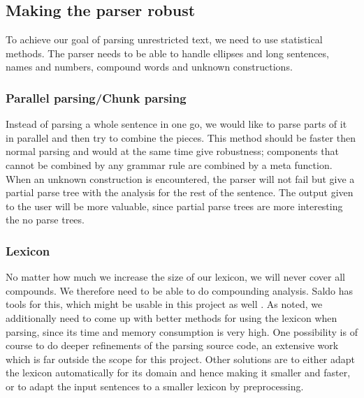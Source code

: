 \documentclass{report}
\begin{document}
\subsection{Making the parser robust}
To achieve our goal of parsing unrestricted text, we need to use statistical methods.
The parser needs to be able to handle
ellipses and long sentences, names and numbers,
compound words and unknown constructions.

\subsubsection{Parallel parsing/Chunk parsing}
Instead of parsing a whole sentence in one go, we would like to
parse parts of it in parallel and then try to combine the pieces.
This method should be faster then normal parsing and would
at the same time give robustness;
components that cannot be combined by any grammar rule are combined by a 
meta function. When an unknown construction is encountered, the parser
will not fail but give a partial parse tree with the analysis for the rest of
the sentence.
The output given to the user will be more valuable, since partial parse
trees are more interesting the no parse trees.

\subsubsection{Lexicon}
\label{sec:futureValency}
No matter how much we increase the size of our lexicon, we will
never cover all compounds. We therefore need to be able to do
compounding analysis. Saldo has tools for this, which might be usable
in this project as well \cite{fm}.
As noted, we additionally need to come up with better methods for using the lexicon when
parsing, since its time and memory consumption is very high.
One possibility is of course to do 
deeper refinements of the parsing source code, an extensive work which is far
outside the scope for this project. Other solutions are to either
adapt the lexicon automatically for its domain and hence making it smaller and
faster, or to adapt the input sentences to a smaller lexicon by preprocessing.
\end{document}
